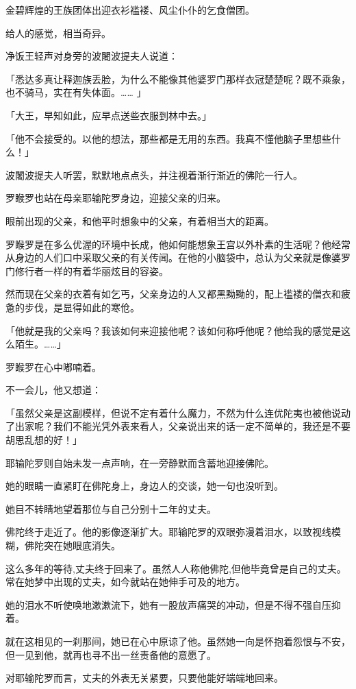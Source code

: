 \documentclass[twoside,openany]{book}
\begin{document}
金碧辉煌的王族团体出迎衣衫褴褛、风尘仆仆的乞食僧团。

给人的感觉，相当奇异。

净饭王轻声对身旁的波闍波提夫人说道：

「悉达多真让释迦族丢脸，为什么不能像其他婆罗门那样衣冠楚楚呢？既不乘象，也不骑马，实在有失体面。……	」

「大王，早知如此，应早点送些衣服到林中去。」

「他不会接受的。以他的想法，那些都是无用的东西。我真不懂他脑子里想些什么！」

波闍波提夫人听罢，默默地点点头，并注视着渐行渐近的佛陀一行人。

罗睺罗也站在母亲耶输陀罗身边，迎接父亲的归来。

眼前出现的父亲，和他平时想象中的父亲，有着相当大的距离。

罗睺罗是在多么优渥的环境中长成，他如何能想象王宫以外朴素的生活呢？他经常从身边的人们口中采取父亲的有关传闻。在他的小脑袋中，总认为父亲就是像婆罗门修行者一样的有着华丽炫目的容姿。

然而现在父亲的衣着有如乞丐，父亲身边的人又都黑黝黝的，配上褴褛的僧衣和疲惫的步伐，是显得如此的寒伧。

「他就是我的父亲吗？我该如何来迎接他呢？该如何称呼他呢？他给我的感觉是这么陌生。……」

罗睺罗在心中嘟喃着。

不一会儿，他又想道：

「虽然父亲是这副模样，但说不定有着什么魔力，不然为什么连优陀夷也被他说动了出家呢？我们不能光凭外表来看人，父亲说出来的话一定不简单的，我还是不要胡思乱想的好！」

耶输陀罗则自始未发一点声响，在一旁静默而含蓄地迎接佛陀。

她的眼睛一直紧盯在佛陀身上，身边人的交谈，她一句也没听到。

她目不转睛地望着那位与自己分别十二年的丈夫。

佛陀终于走近了。他的影像逐渐扩大。耶输陀罗的双眼弥漫着泪水，以致视线模糊，佛陀突在她眼底消失。

这么多年的等待,丈夫终于回来了。虽然人人称他佛陀,但他毕竟曾是自己的丈夫。常在她梦中出现的丈夫，如今就站在她伸手可及的地方。

她的泪水不听使唤地漱漱流下，她有一股放声痛哭的冲动，但是不得不强自压抑着。

就在这相见的一刹那间，她已在心中原谅了他。虽然她一向是怀抱着怨恨与不安，但一见到他，就再也寻不出一丝责备他的意愿了。

对耶输陀罗而言，丈夫的外表无关紧要，只要他能好端端地回来。
\end{document}
